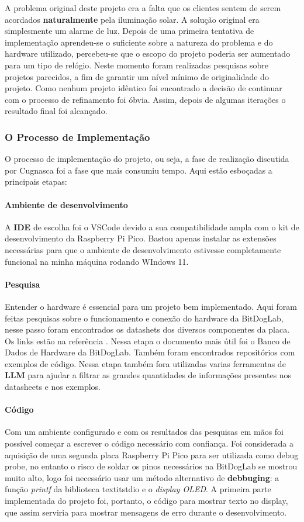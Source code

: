 \documentclass[12pt]{article}
\begin{document}
A problema original deste projeto era a falta que os clientes sentem de serem acordados \textbf{naturalmente} pela iluminação solar. A solução original era simplesmente um alarme de luz. Depois de uma primeira tentativa de implementação aprendeu-se o suficiente sobre a natureza do problema e do hardware utilizado, percebeu-se que o escopo do projeto poderia ser aumentado para um tipo de relógio. Neste momento foram realizadas pesquisas sobre projetos parecidos, a fim de garantir um nível mínimo de originalidade do projeto. Como nenhum projeto idêntico foi encontrado a decisão de continuar com o processo de refinamento foi óbvia. Assim, depois de algumas iterações o resultado final foi alcançado.
\subsubsection{O Processo de Implementação}
O processo de implementação do projeto, ou seja, a fase de realização discutida por Cugnasca\cite{cugnasca} foi a fase que mais consumiu tempo. Aqui estão esboçadas a principais etapas:
\paragraph{Ambiente de desenvolvimento} A \textbf{IDE} de escolha foi o VSCode devido a sua compatibilidade ampla com o kit de desenvolvimento da Raspberry Pi Pico. Bastou apenas instalar as extensões necessárias para que o ambiente de desenvolvimento estivesse completamente funcional na minha máquina rodando WIndows 11.
\paragraph{Pesquisa} Entender o hardware é essencial para um projeto bem implementado. Aqui foram feitas pesquisas sobre o funcionamento e conexão do hardware da BitDogLab, nesse passo foram encontrados os datashets dos diversos componentes da placa. Os links estão na referência\cite{picosdkdocs} \cite{WS2812Bdatasheet}. Nessa etapa o documento mais útil foi o Banco de Dados de Hardware da BitDogLab\cite{BitDogLabBIH}. Também foram encontrados repositórios com exemplos de código. \cite{BitDogLabC} \cite{picoexamples}
Nessa etapa também fora utilizadas varias ferramentas de \textbf{LLM} para ajudar a filtrar as grandes quantidades de informações presentes nos datasheets e nos exemplos.
\paragraph{Código} Com um ambiente configurado e com os resultados das pesquisas em mãos foi possível começar a escrever o código necessário com confiança. Foi considerada a aquisição de uma segunda placa Raspberry Pi Pico para ser utilizada como debug probe, no entanto o risco de soldar os pinos necessários na BitDogLab se mostrou muito alto, logo foi necessário usar um método alternativo de \textbf{debbuging}: a função \textit{printf} da biblioteca textit{stdio} e o \textit{display OLED}. 
A primeira parte implementada do projeto foi, portanto, o código para mostrar texto no display, que assim serviria para mostrar mensagens de erro durante o desenvolvimento.
\end{document}
